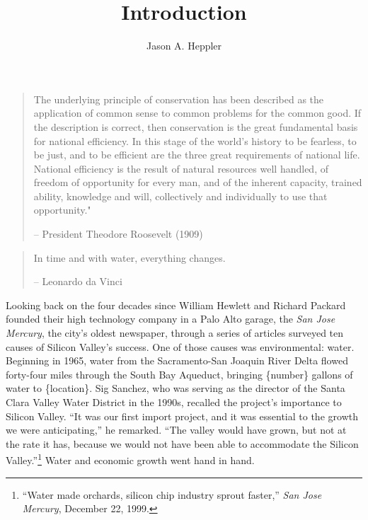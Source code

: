 \documentclass[11pt,article,oneside]{memoir}
\title{\bigskip \bigskip Introduction}
\author{\bigskip\Large Jason A. Heppler}
\begin{document}
  

\setsansfont[Mapping=tex-text, BoldFont={* Bold SemiCondensed}, ItalicFont={* Semibold SemiCondensed Italic}]{Myriad Pro}
\setmonofont[Mapping=tex-text,Scale=MatchLowercase]{Consolas}


\setsansfont[Mapping=tex-text]{Minion Pro} 
\setmonofont[Mapping=tex-text,Scale=0.8]{Consolas}
\pagestyle{kjh}


\maketitle


\begin{quote}
The underlying principle of conservation has been described as the
application of common sense to common problems for the common good. If
the description is correct, then conservation is the great fundamental
basis for national efficiency. In this stage of the world's history to
be fearless, to be just, and to be efficient are the three great
requirements of national life. National efficiency is the result of
natural resources well handled, of freedom of opportunity for every man,
and of the inherent capacity, trained ability, knowledge and will,
collectively and individually to use that opportunity."

-- President Theodore Roosevelt (1909)
\end{quote}

\begin{quote}
In time and with water, everything changes.

-- Leonardo da Vinci
\end{quote}

Looking back on the four decades since William Hewlett and Richard
Packard founded their high technology company in a Palo Alto garage, the
\emph{San Jose Mercury}, the city's oldest newspaper, through a series
of articles surveyed ten causes of Silicon Valley's success. One of
those causes was environmental: water. Beginning in 1965, water from the
Sacramento-San Joaquin River Delta flowed forty-four miles through the
South Bay Aqueduct, bringing \{number\} gallons of water to
\{location\}. Sig Sanchez, who was serving as the director of the Santa
Clara Valley Water District in the 1990s, recalled the project's
importance to Silicon Valley. ``It was our first import project, and it
was essential to the growth we were anticipating,'' he remarked. ``The
valley would have grown, but not at the rate it has, because we would
not have been able to accommodate the Silicon Valley.''\footnote{``Water
  made orchards, silicon chip industry sprout faster,'' \emph{San Jose
  Mercury}, December 22, 1999.} Water and economic growth went hand in
hand.
\end{document}

